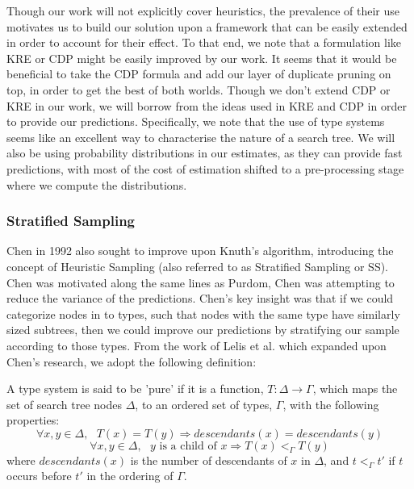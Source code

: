 \documentclass{article}
\begin{document}
Though our work will not explicitly cover heuristics,
the prevalence of their use motivates us to build our solution
upon a framework that can be easily extended in order to account for their effect.
To that end, we note that a formulation like KRE or CDP might
be easily improved by our work.
It seems that it would be beneficial to take the CDP formula and add our layer
of duplicate pruning on top, in order to get the best of both worlds.
Though we don't extend CDP or KRE in our work,
we will borrow from the ideas used in KRE and CDP
in order to provide our predictions.
Specifically, we note that the use of type
systems seems like an excellent way to characterise the nature of a search tree.
We will also be using probability distributions in our estimates,
as they can provide fast predictions, with most of the cost of
estimation shifted to a pre-processing stage where we compute the distributions.

\subsubsection*{Stratified Sampling}

Chen in 1992 \cite{chen1992heuristic} also sought to improve upon Knuth's algorithm, introducing the concept of Heuristic Sampling (also referred to as Stratified Sampling or SS).
Chen was motivated along the same lines as Purdom, Chen was attempting to reduce the variance of the predictions.
Chen's key insight was that if we could categorize nodes in to types, such that nodes with the same type
have similarly sized subtrees, then we could improve our predictions by stratifying our sample according to those types.
From the work of Lelis et al. \cite{lelis2013predicting} which expanded upon Chen's research, we adopt the following definition:

A type system is said to be 'pure' if it is a function, \(T : \Delta \rightarrow \Gamma \), which maps
the set of search tree nodes \(\Delta\), to an ordered set of types, \(\Gamma\), with the following properties:
\begin{equation}
  \forall x, y \in \Delta, \text{ }T(x) = T(y) \Rightarrow descendants(x) = descendants(y)
\end{equation}
\begin{equation}
  \forall x, y \in \Delta, \text{ }y \text{ is a child of } x \Rightarrow T(x) <_{\Gamma} T(y)
\end{equation}
where \(descendants(x)\) is the number of descendants of \(x\) in \(\Delta\),
and \(t <_{\Gamma} t'\) if \(t\) occurs before \(t'\) in the ordering of \(\Gamma\). \\
\end{document}
